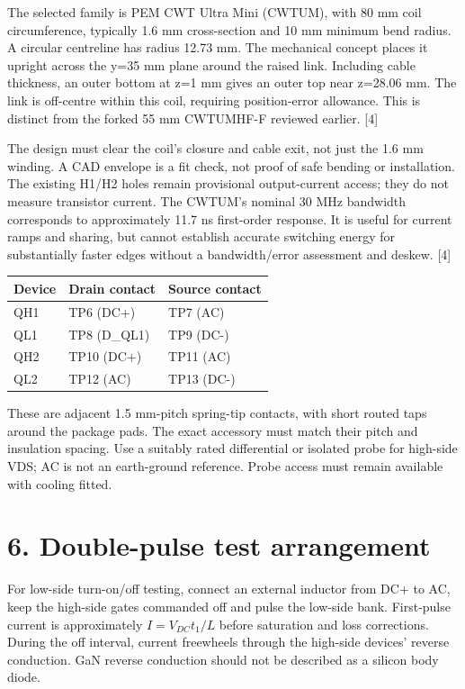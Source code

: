 \documentclass[10pt,a4paper]{article}
\begin{document}
The selected family is PEM CWT Ultra Mini (CWTUM), with 80 mm coil circumference, typically 1.6 mm cross-section and 10 mm minimum bend radius. A circular centreline has radius 12.73 mm. The mechanical concept places it upright across the y=35 mm plane around the raised link. Including cable thickness, an outer bottom at z=1 mm gives an outer top near z=28.06 mm. The link is off-centre within this coil, requiring position-error allowance. This is distinct from the forked 55 mm CWTUMHF-F reviewed earlier. [4]

The design must clear the coil's closure and cable exit, not just the 1.6 mm winding. A CAD envelope is a fit check, not proof of safe bending or installation. The existing H1/H2 holes remain provisional output-current access; they do not measure transistor current. The CWTUM's nominal 30 MHz bandwidth corresponds to approximately 11.7 ns first-order response. It is useful for current ramps and sharing, but cannot establish accurate switching energy for substantially faster edges without a bandwidth/error assessment and deskew. [4]

\begin{center}\begin{tabular}{lll}\hline
Device & Drain contact & Source contact\\\hline
QH1 & TP6 (DC+) & TP7 (AC)\\
QL1 & TP8 (D\_QL1) & TP9 (DC-)\\
QH2 & TP10 (DC+) & TP11 (AC)\\
QL2 & TP12 (AC) & TP13 (DC-)\\\hline
\end{tabular}\end{center}
These are adjacent 1.5 mm-pitch spring-tip contacts, with short routed taps around the package pads. The exact accessory must match their pitch and insulation spacing. Use a suitably rated differential or isolated probe for high-side VDS; AC is not an earth-ground reference. Probe access must remain available with cooling fitted.

\section*{6. Double-pulse test arrangement}
For low-side turn-on/off testing, connect an external inductor from DC+ to AC, keep the high-side gates commanded off and pulse the low-side bank. First-pulse current is approximately $I=V_{DC}t_1/L$ before saturation and loss corrections. During the off interval, current freewheels through the high-side devices' reverse conduction. GaN reverse conduction should not be described as a silicon body diode.
\end{document}

